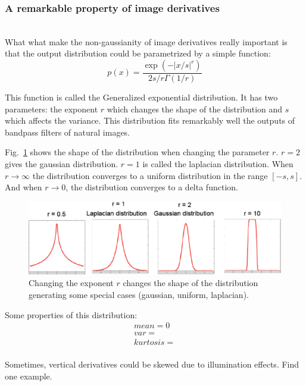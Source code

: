 \subsubsection{A remarkable property of image derivatives}
~\\

What what make the non-gaussianity of image derivatives really important is that the output distribution could be parametrized by a simple function:
\begin{equation}
p(x) = \frac{\exp \left(- \left| x/s  \right|^r \right)}{2s/r \Gamma(1/r)}
\label{eq:derdist}
\end{equation}

This function is called the Generalized exponential distribution. It has two parameters: the exponent $r$ which changes the shape of the distribution and $s$ which affects the variance. This distribution fits remarkably well the outputs of bandpass filters of natural images. 

Fig.~\ref{fig:generalizedgaussian} shows the shape of the distribution when changing the parameter $r$. $r=2$ gives the gaussian distribution. $r=1$ is called the laplacian distribution. When $r \to \infty$ the distribution converges to a uniform distribution in the range $\left[-s, s\right]$. And when $r \to 0$, the distribution converges to a delta function.
\begin{figure}[htpb]
\centerline{
\includegraphics[width=1\linewidth]{figures/statistical_image_models/generalizedgaussian.eps}
} 
\caption{Changing the exponent $r$ changes the shape of the distribution generating some special cases (gaussian, uniform, laplacian).} 
\label{fig:generalizedgaussian}
\end{figure}


Some properties of this distribution:
\begin{eqnarray}
mean = 0\\
var = \\
kurtosis = \\
\end{eqnarray}

Sometimes, vertical derivatives could be skewed due to illumination effects. Find one example.

